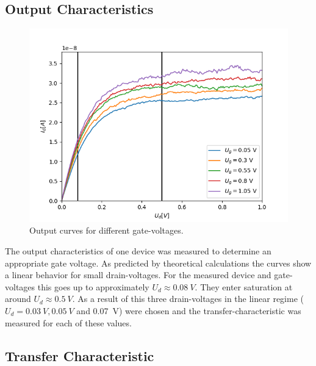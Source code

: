 \documentclass[%
 reprint,
amsmath,amssymb,
pra,
]{revtex4-1}
\begin{document}
\subsection{Output Characteristics}
\begin{figure}
\centering
\includegraphics[scale=0.6]{Bilder/output.png}
\caption{Output curves for different gate-voltages.}
\label{fig:output}
\end{figure}

The output characteristics of one device was measured to determine an appropriate gate voltage. As predicted by theoretical calculations the curves show a linear behavior for small drain-voltages. For the measured device and gate-voltages this goes up to approximately $U_d \approx \SI{0.08}{V}$. They enter saturation at around $U_d \approx \SI{0.5}{V}$. As a result of this three drain-voltages in the linear regime ($U_d = \SI{0.03}{V},\SI{0.05}{V} $ and \SI{0.07}{V}) were chosen and the transfer-characteristic was measured for each of these values.

\subsection{Transfer Characteristic}
\end{document}
